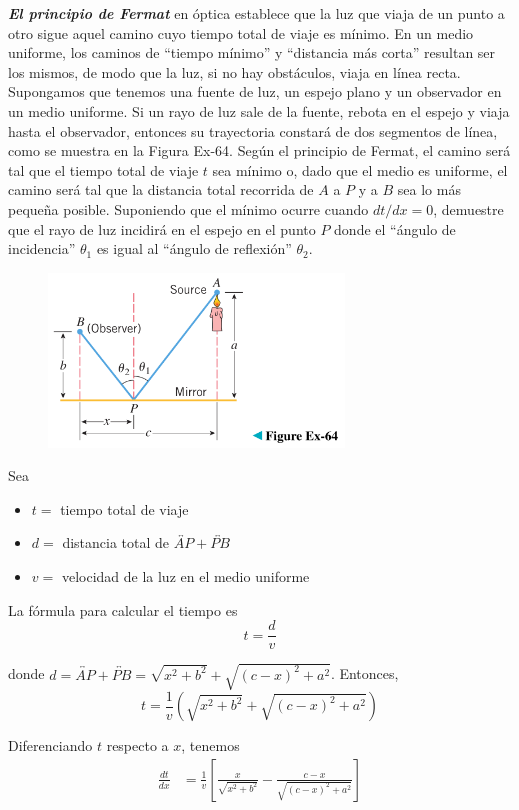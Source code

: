 \documentclass[12pt]{article}
\begin{document}
\textit{\textbf{El principio de Fermat}} en óptica establece que la luz que viaja de un punto a otro sigue aquel camino cuyo tiempo total de viaje es mínimo. En un medio uniforme, los caminos de ``tiempo mínimo'' y ``distancia más corta'' resultan ser los mismos, de modo que la luz, si no hay obstáculos, viaja en línea recta. Supongamos que tenemos una fuente de luz, un espejo plano y un observador en un medio uniforme. Si un rayo de luz sale de la fuente, rebota en el espejo y viaja hasta el observador, entonces su trayectoria constará de dos segmentos de línea, como se muestra en la Figura Ex-64. Según el principio de Fermat, el camino será tal que el tiempo total de viaje $t$ sea mínimo o, dado que el medio es uniforme, el camino será tal que la distancia total recorrida de $A$ a $P$ y a $B$ sea lo más pequeña posible. Suponiendo que el mínimo ocurre cuando $dt/dx = 0$, demuestre que el rayo de luz incidirá en el espejo en el punto $P$ donde el ``ángulo de incidencia'' $\theta_1$ es igual al ``ángulo de reflexión'' $\theta_2$.
\begin{figure}[H]
\centering
\includegraphics[width=0.7\textwidth]{../img/img_Lista3/3_64.png}
\end{figure}

Sea
\begin{itemize}
\item $t= $ tiempo total de viaje
\item $d= $ distancia total de $\overleftrightarrow{AP}+\overleftrightarrow{PB}$
\item $v= $ velocidad de la luz en el medio uniforme
\end{itemize}

La fórmula para calcular el tiempo es 
\[
t=\frac{d}{v}
\]

donde $d=\overleftrightarrow{AP}+\overleftrightarrow{PB}=\sqrt{x^2+b^2}+\sqrt{(c-x)^2+a^2}$. Entonces,
\[
t=\frac{1}{v}\left( \sqrt{x^2+b^2}+\sqrt{(c-x)^2+a^2} \right)
\]

Diferenciando $t$ respecto a $x$, tenemos
\begin{align*}
  \frac{dt}{dx}
  &=\frac{1}{v}\left[ \frac{x}{\sqrt{x^2+b^2}}-\frac{c-x}{\sqrt{(c-x)^2+a^2}} \right]
\end{align*}
\end{document}

